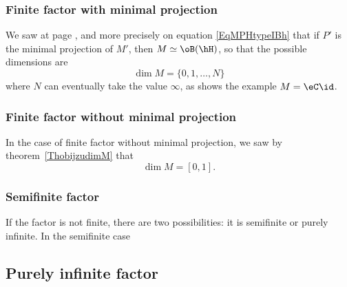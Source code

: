 \subsubsection{Finite factor with minimal projection}

We saw at page \pageref{PgtypeIonavu}, and more precisely on equation \eqref{EqMPHtypeIBh} that if $P'$ is the minimal projection of $M'$, then $M\simeq\oB(\hH)$, so that the possible dimensions are
\begin{equation}
	\dim M=\{ 0,1,\ldots,N \}
\end{equation}
where $N$ can eventually take the value $\infty$, as shows the example $M=\eC\id$.

\subsubsection{Finite factor without minimal projection}

In the case of finite factor without minimal projection, we saw by theorem~\ref{ThobijzudimM} that
\begin{equation}
	\dim M=[0,1].
\end{equation}

\subsubsection{Semifinite factor}

If the factor is not finite, there are two possibilities: it is semifinite or purely infinite. In the semifinite case

\subsection{Purely infinite factor}

